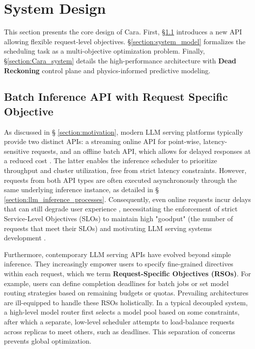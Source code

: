 \documentclass[letterpaper, anonymous, twocolumn, 10pt]{article}
\begin{document}
\section{System Design} \label{section:design}

This section presents the core design of Cara. First, \S \ref{section:API} introduces a new API allowing flexible request-level objectives. \S \ref{section:system_model} formalizes the scheduling task as a multi-objective optimization problem. Finally, \S \ref{section:Cara_system} details the high-performance architecture with \textbf{Dead Reckoning} control plane and physics-informed predictive modeling.

\subsection{Batch Inference API with Request Specific Objective} \label{section:API}

As discussed in § \ref{section:motivation}, modern LLM serving platforms typically provide two distinct APIs: a streaming online API for point-wise, latency-sensitive requests, and an offline batch API, which allows for delayed responses at a reduced cost \cite{googleBatchGemini, openaiOpenAIPlatform}. The latter enables the inference scheduler to prioritize throughput and cluster utilization, free from strict latency constraints. However, requests from both API types are often executed asynchronously through the same underlying inference instance, as detailed in § \ref{section:llm_inference_processes}. Consequently, even online requests incur delays that can still degrade user experience \cite{wang2024revisitingslogoodputmetrics}, necessitating the enforcement of strict Service-Level Objectives (SLOs) to maintain high "goodput" (the number of requests that meet their SLOs) and motivating LLM serving systems development \cite{liu2025turbospecclosedloopspeculationcontrol, zhong2024distservedisaggregatingprefilldecoding, wang2025prefilldecodeaggregationdisaggregationunifying} .

Furthermore, contemporary LLM serving APIs have evolved beyond simple inference. They increasingly empower users to specify fine-grained directives within each request, which we term \textbf{Request-Specific Objectives (RSOs)}. For example, users can define completion deadlines for batch jobs or set model routing strategies \cite{openaiIntroducingGPT5, microsoftModelRouter} based on remaining budgets or quotas. Prevailing architectures are ill-equipped to handle these RSOs holistically. In a typical decoupled system, a high-level model router first selects a model pool based on some constraints, after which a separate, low-level scheduler attempts to load-balance requests across replicas to meet others, such as deadlines. This separation of concerns prevents global optimization.
\end{document}
